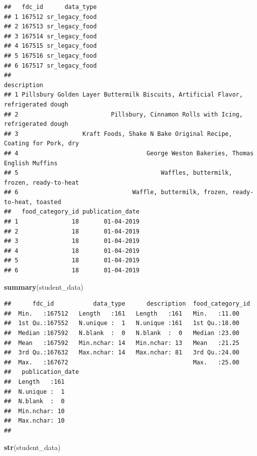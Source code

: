 \documentclass[
]{article}
\newenvironment{Shaded}{\begin{snugshade}}{\end{snugshade}}
\newcommand{\FunctionTok}[1]{\textcolor[rgb]{0.13,0.29,0.53}{\textbf{#1}}}
\newcommand{\NormalTok}[1]{#1}
\begin{document}
\begin{verbatim}
##   fdc_id      data_type
## 1 167512 sr_legacy_food
## 2 167513 sr_legacy_food
## 3 167514 sr_legacy_food
## 4 167515 sr_legacy_food
## 5 167516 sr_legacy_food
## 6 167517 sr_legacy_food
##                                                                         description
## 1 Pillsbury Golden Layer Buttermilk Biscuits, Artificial Flavor, refrigerated dough
## 2                          Pillsbury, Cinnamon Rolls with Icing, refrigerated dough
## 3                  Kraft Foods, Shake N Bake Original Recipe, Coating for Pork, dry
## 4                                    George Weston Bakeries, Thomas English Muffins
## 5                                        Waffles, buttermilk, frozen, ready-to-heat
## 6                                Waffle, buttermilk, frozen, ready-to-heat, toasted
##   food_category_id publication_date
## 1               18       01-04-2019
## 2               18       01-04-2019
## 3               18       01-04-2019
## 4               18       01-04-2019
## 5               18       01-04-2019
## 6               18       01-04-2019
\end{verbatim}

\begin{Shaded}
\begin{Highlighting}[]
\FunctionTok{summary}\NormalTok{(student\_data)}
\end{Highlighting}
\end{Shaded}

\begin{verbatim}
##      fdc_id           data_type      description  food_category_id
##  Min.   :167512   Length   :161   Length   :161   Min.   :11.00   
##  1st Qu.:167552   N.unique :  1   N.unique :161   1st Qu.:18.00   
##  Median :167592   N.blank  :  0   N.blank  :  0   Median :23.00   
##  Mean   :167592   Min.nchar: 14   Min.nchar: 13   Mean   :21.25   
##  3rd Qu.:167632   Max.nchar: 14   Max.nchar: 81   3rd Qu.:24.00   
##  Max.   :167672                                   Max.   :25.00   
##   publication_date
##  Length   :161    
##  N.unique :  1    
##  N.blank  :  0    
##  Min.nchar: 10    
##  Max.nchar: 10    
## 
\end{verbatim}

\begin{Shaded}
\begin{Highlighting}[]
\FunctionTok{str}\NormalTok{(student\_data)}
\end{Highlighting}
\end{Shaded}
\end{document}
